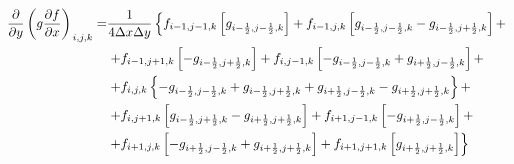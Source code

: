 \begin{equation*}
    \begin{split}
        \left.
            \frac
                {\partial}
                {\partial y}
            \left(
                g
                \frac
                    {\partial f}
                    {\partial x}
            \right)
        \right._{i, j, k}
        = &
        \frac
            {1}
            {4 \Delta x \Delta y}
        \left\{
            f_{i - 1, j - 1, k}
            \left[
                g_{i - \frac{1}{2}, j - \frac{1}{2}, k}
            \right]
            +
            f_{i - 1, j, k}
            \left[
                g_{i - \frac{1}{2}, j - \frac{1}{2}, k}
                -
                g_{i - \frac{1}{2}, j + \frac{1}{2}, k}
            \right]
            +
        \right.
        \\ &
        \left.
            +
            f_{i - 1, j + 1, k}
            \left[
                -
                g_{i - \frac{1}{2}, j + \frac{1}{2}, k}
            \right]
            +
            f_{i, j - 1, k}
            \left[
                -
                g_{i - \frac{1}{2}, j - \frac{1}{2}, k}
                +
                g_{i + \frac{1}{2}, j - \frac{1}{2}, k}
            \right]
            +
        \right.
        \\ &
        \left.
            +
            f_{i, j, k}
            \left\{
                - g_{i - \frac{1}{2}, j - \frac{1}{2}, k}
                + g_{i - \frac{1}{2}, j + \frac{1}{2}, k}
                + g_{i + \frac{1}{2}, j - \frac{1}{2}, k}
                - g_{i + \frac{1}{2}, j + \frac{1}{2}, k}
            \right\}
            +
        \right.
        \\ &
        \left.
            +
            f_{i, j + 1, k}
            \left[
                g_{i - \frac{1}{2}, j + \frac{1}{2}, k}
                -
                g_{i + \frac{1}{2}, j + \frac{1}{2}, k}
            \right]
            +
            f_{i + 1, j - 1, k}
            \left[
                - g_{i + \frac{1}{2}, j - \frac{1}{2}, k}
            \right]
            +
        \right.
        \\ &
        \left.
            +
            f_{i + 1, j, k}
            \left[
                -
                g_{i + \frac{1}{2}, j - \frac{1}{2}, k}
                +
                g_{i + \frac{1}{2}, j + \frac{1}{2}, k}
            \right]
            +
            f_{i + 1, j + 1, k}
            \left[
                g_{i + \frac{1}{2}, j + \frac{1}{2}, k}
            \right]
        \right\}
    \end{split}
\end{equation*}

